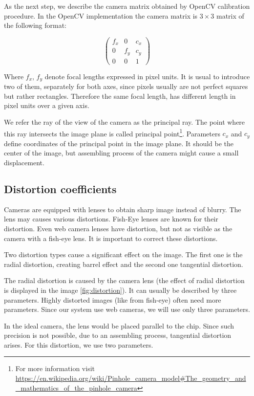 As the next step, we describe the camera matrix obtained by OpenCV calibration
procedure. In the OpenCV implementation the camera matrix is $3\times3$ matrix of the
following format:

\[
\begin{pmatrix}
	f_x 	& 0 	& c_x \\
	0	& f_y	& c_y \\
	0	& 0	& 1
\end{pmatrix}
\]

Where $f_x$, $f_y$ denote focal lengths expressed in pixel units. It is usual
to introduce two of them, separately for both axes, since pixels usually are
not perfect squares but rather rectangles. Therefore the same focal length, has
different length in pixel units over a given axis.

We refer the ray of the view of the camera as the principal ray. The point
where this ray intersects the image plane is called principal
point\footnote{For more information visit \url{https://en.wikipedia.org/wiki/Pinhole\_camera\_model\#The\_geometry\_and\_mathematics\_of\_the\_pinhole\_camera}}.
Parameters $c_x$ and $c_y$ define coordinates of the principal point in the
image plane.  It should be the center of the image, but assembling process of
the camera might cause a small displacement.

\subsection{Distortion coefficients}

Cameras are equipped with lenses to obtain sharp image instead of blurry. The
lens may causes various distortions. Fish-Eye lenses are known for their
distortion.  Even web camera lenses have distortion, but not as visible as the
camera with a fish-eye lens. It is important to correct these distortions.

Two distortion types cause a significant effect on the image. The first one is
the radial distortion, creating barrel effect and the second one tangential distortion.

The radial distortion is caused by the camera lens (the effect of radial
distortion is displayed in the image \ref{fig:distortion}). It can usually be
described by three parameters. Highly distorted images (like from fish-eye)
often need more parameters. Since our system use web cameras, we will use only
three parameters.

In the ideal camera, the lens would be placed parallel to the chip. Since such
precision is not possible, due to an assembling process, tangential distortion
arises. For this distortion, we use two parameters.

